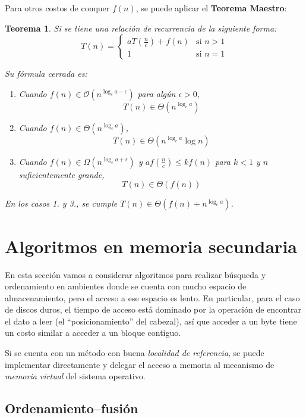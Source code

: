 \documentclass{article}
\newcommand{\BigO}[1]{{\mathcal{O}(#1)}}
\newcommand{\BigOmega}[1]{{\Omega(#1)}}
\newcommand{\BigTheta}[1]{{\Theta(#1)}}
\newtheorem*{theorem*}{Teorema}
\begin{document}
Para otros costos de conquer $f(n)$, se puede aplicar el \textbf{Teorema Maestro}:

\begin{theorem*}
    Si se tiene una relación de recurrencia de la siguiente forma:
    $$
        T(n) =
        \begin{cases}
            a T\left(\frac{n}{c}\right) + f(n) & \text{si } n > 1 \\
            1                                  & \text{si } n = 1
        \end{cases}
    $$

    Su fórmula cerrada es:
    \begin{enumerate}
        \item Cuando $f(n) \in \BigO{n^{\log_c{a} - \epsilon}}$ para algún $\epsilon > 0$,
              $$T(n) \in \BigTheta{n^{\log_c{a}}}$$
        \item Cuando $f(n) \in \BigTheta{n^{\log_c{a}}}$,
              $$T(n) \in \BigTheta{n^{\log_c{a}} \log{n}}$$
        \item Cuando $f(n) \in \BigOmega{n^{\log_c{a} + \epsilon}}$ y $a f\left(\frac{n}{c}\right) \leq k f(n)$ para $k < 1$ y $n$ suficientemente grande,
              $$T(n) \in \BigTheta{f(n)}$$
    \end{enumerate}

    En los casos 1. y 3., se cumple $T(n) \in \BigTheta{f(n) + n^{\log_c{a}}}$.
\end{theorem*}

\section{Algoritmos en memoria secundaria}

En esta sección vamos a considerar algoritmos para realizar búsqueda y ordenamiento en ambientes donde se cuenta con mucho espacio de almacenamiento, pero el acceso a ese espacio es lento. En particular, para el caso de discos duros, el tiempo de acceso está dominado por la operación de encontrar el dato a leer (el ``posicionamiento'' del cabezal), así que acceder a un byte tiene un costo similar a acceder a un bloque contiguo.

Si se cuenta con un método con buena \textit{localidad de referencia}, se puede implementar directamente y delegar el acceso a memoria al mecanismo de \textit{memoria virtual} del sistema operativo.

\subsection{Ordenamiento--fusión}
\end{document}
